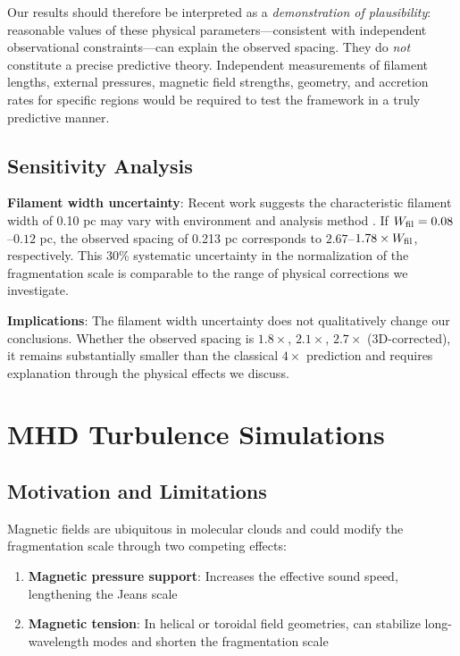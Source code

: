 \documentclass[11pt,a4paper]{article}
\begin{document}
Our results should therefore be interpreted as a \textit{demonstration of plausibility}: reasonable values of these physical parameters—consistent with independent observational constraints—can explain the observed spacing. They do \textit{not} constitute a precise predictive theory. Independent measurements of filament lengths, external pressures, magnetic field strengths, geometry, and accretion rates for specific regions would be required to test the framework in a truly predictive manner.

\subsection{Sensitivity Analysis}
\label{sec:sensitivity}

\textbf{Filament width uncertainty}: Recent work suggests the characteristic filament width of 0.10 pc may vary with environment and analysis method \citep{Panopoulou2022, Hacar2023}. If $W_{\rm fil} = 0.08$--$0.12$ pc, the observed spacing of 0.213 pc corresponds to $2.67$--$1.78\times W_{\rm fil}$, respectively. This 30\% systematic uncertainty in the normalization of the fragmentation scale is comparable to the range of physical corrections we investigate.

\textbf{Implications}: The filament width uncertainty does not qualitatively change our conclusions. Whether the observed spacing is $1.8\times$, $2.1\times$, $2.7\times$ (3D-corrected), it remains substantially smaller than the classical $4\times$ prediction and requires explanation through the physical effects we discuss.

\section{MHD Turbulence Simulations}

\subsection{Motivation and Limitations}

Magnetic fields are ubiquitous in molecular clouds and could modify the fragmentation scale through two competing effects:
\begin{enumerate}
    \item \textbf{Magnetic pressure support}: Increases the effective sound speed, lengthening the Jeans scale
    \item \textbf{Magnetic tension}: In helical or toroidal field geometries, can stabilize long-wavelength modes and shorten the fragmentation scale
\end{enumerate}
\end{document}
